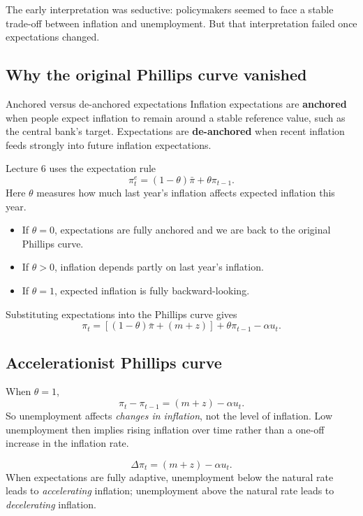 \documentclass[12pt]{article}
\begin{document}
The early interpretation was seductive: policymakers seemed to face a stable trade-off between inflation and unemployment. But that interpretation failed once expectations changed.

\subsection{Why the original Phillips curve vanished}

\begin{definition}{Anchored versus de-anchored expectations}{}
Inflation expectations are \textbf{anchored} when people expect inflation to remain around a stable reference value, such as the central bank's target. Expectations are \textbf{de-anchored} when recent inflation feeds strongly into future inflation expectations.
\end{definition}

Lecture 6 uses the expectation rule
\[
\pi_t^e=(1-\theta)\bar{\pi}+\theta \pi_{t-1}.
\]
Here $\theta$ measures how much last year's inflation affects expected inflation this year.

\begin{itemize}[leftmargin=1.5em]
\item If $\theta=0$, expectations are fully anchored and we are back to the original Phillips curve.
\item If $\theta>0$, inflation depends partly on last year's inflation.
\item If $\theta=1$, expected inflation is fully backward-looking.
\end{itemize}

Substituting expectations into the Phillips curve gives
\[
\pi_t=[(1-\theta)\bar{\pi}+(m+z)] + \theta \pi_{t-1}-\alpha u_t.
\]

\subsection{Accelerationist Phillips curve}

When $\theta=1$,
\[
\pi_t-\pi_{t-1}=(m+z)-\alpha u_t.
\]
So unemployment affects \emph{changes in inflation}, not the level of inflation. Low unemployment then implies rising inflation over time rather than a one-off increase in the inflation rate.

\newpage
\begin{keyformula}[title={Key Formula: Accelerationist Phillips Curve}]
\[
\Delta \pi_t=(m+z)-\alpha u_t.
\]
When expectations are fully adaptive, unemployment below the natural rate leads to \emph{accelerating} inflation; unemployment above the natural rate leads to \emph{decelerating} inflation.
\end{keyformula}
\end{document}
